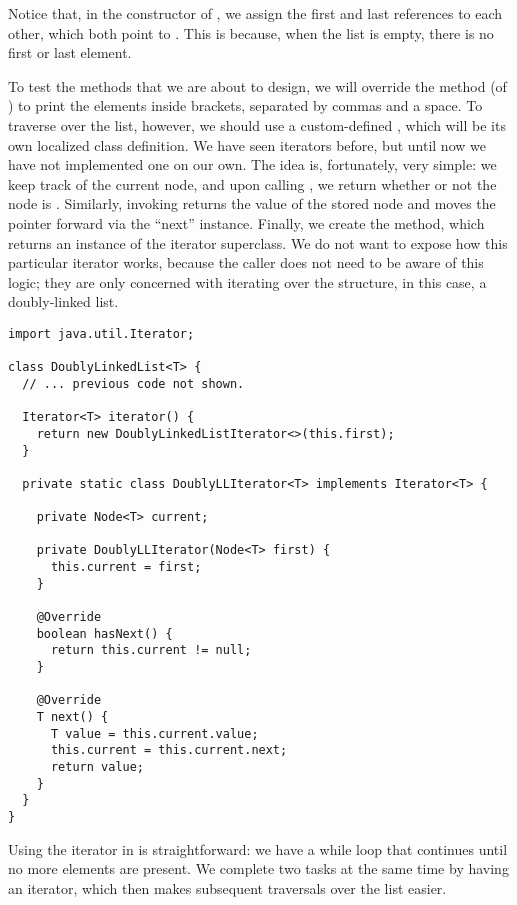 Notice that, in the constructor of , we assign the first and last references to each other, which both point to . This is because, when the list is empty, there is no first or last element.

To test the methods that we are about to design, we will override the  method (of ) to print the elements inside brackets, separated by commas and a space. To traverse over the list, however, we should use a custom-defined , which will be its own localized class definition. We have seen iterators before, but until now we have not implemented one on our own. The idea is, fortunately, very simple: we keep track of the current node, and upon calling , we return whether or not the node is . Similarly, invoking  returns the value of the stored node and moves the pointer forward via the ``next'' instance. Finally, we create the  method, which returns an instance of the iterator superclass. We do not want to expose how this particular iterator works, because the caller does not need to be aware of this logic; they are only concerned with iterating over the structure, in this case, a doubly-linked list.

\begin{lstlisting}[language=MyJava]
import java.util.Iterator;

class DoublyLinkedList<T> {
  // ... previous code not shown.

  Iterator<T> iterator() {
    return new DoublyLinkedListIterator<>(this.first);
  }

  private static class DoublyLLIterator<T> implements Iterator<T> {
    
    private Node<T> current;

    private DoublyLLIterator(Node<T> first) {
      this.current = first;
    }

    @Override
    boolean hasNext() { 
      return this.current != null; 
    }

    @Override
    T next() {
      T value = this.current.value;
      this.current = this.current.next;
      return value;
    }
  }
}
\end{lstlisting}

Using the iterator in  is straightforward: we have a while loop that continues until no more elements are present. We complete two tasks at the same time by having an iterator, which then makes subsequent traversals over the list easier.


